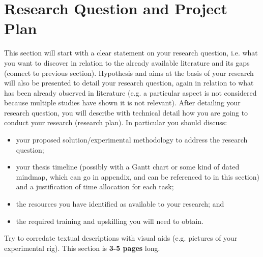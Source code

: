 \section{Research Question and Project Plan}

This section will start with a clear statement on your research question, i.e. what you want to discover in relation to the already available literature and its gaps (connect to previous section). Hypothesis and aims at the basis of your research will also be presented to detail your research question, again in relation to what has been already observed in literature (e.g. a particular aspect is not considered because multiple studies have shown it is not relevant). After detailing your research question, you will describe with technical detail how you are going to conduct your research (research plan). In particular you should discuss:

\begin{itemize}
    \item your proposed solution/experimental methodology to address the research question;
    \item your thesis timeline (possibly with a Gantt chart or some kind of dated mindmap, which can go in appendix, and can be referenced to in this section) and a justification of time allocation for each task;
    \item the resources you have identified as available to your research; and
    \item the required training and upskilling you will need to obtain.
\end{itemize}
Try to corredate textual descriptions with visual aids (e.g. pictures of your experimental rig).
This section is \textbf{3-5 pages} long. 